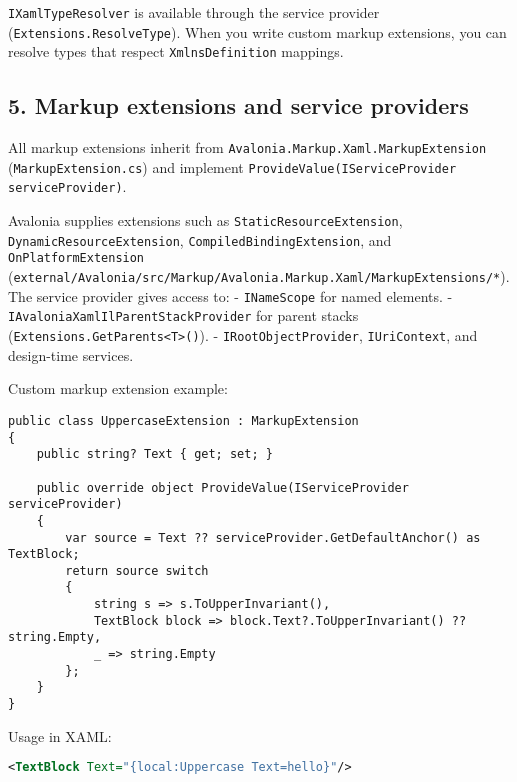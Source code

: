 \passthrough{\lstinline!IXamlTypeResolver!} is available through the
service provider (\passthrough{\lstinline!Extensions.ResolveType!}).
When you write custom markup extensions, you can resolve types that
respect \passthrough{\lstinline!XmlnsDefinition!} mappings.

\subsection{5. Markup extensions and service
providers}\label{markup-extensions-and-service-providers}

All markup extensions inherit from
\passthrough{\lstinline!Avalonia.Markup.Xaml.MarkupExtension!}
(\passthrough{\lstinline!MarkupExtension.cs!}) and implement
\passthrough{\lstinline!ProvideValue(IServiceProvider serviceProvider)!}.

Avalonia supplies extensions such as
\passthrough{\lstinline!StaticResourceExtension!},
\passthrough{\lstinline!DynamicResourceExtension!},
\passthrough{\lstinline!CompiledBindingExtension!}, and
\passthrough{\lstinline!OnPlatformExtension!}
(\passthrough{\lstinline!external/Avalonia/src/Markup/Avalonia.Markup.Xaml/MarkupExtensions/*!}).
The service provider gives access to: -
\passthrough{\lstinline!INameScope!} for named elements. -
\passthrough{\lstinline!IAvaloniaXamlIlParentStackProvider!} for parent
stacks (\passthrough{\lstinline!Extensions.GetParents<T>()!}). -
\passthrough{\lstinline!IRootObjectProvider!},
\passthrough{\lstinline!IUriContext!}, and design-time services.

Custom markup extension example:

\begin{lstlisting}
public class UppercaseExtension : MarkupExtension
{
    public string? Text { get; set; }

    public override object ProvideValue(IServiceProvider serviceProvider)
    {
        var source = Text ?? serviceProvider.GetDefaultAnchor() as TextBlock;
        return source switch
        {
            string s => s.ToUpperInvariant(),
            TextBlock block => block.Text?.ToUpperInvariant() ?? string.Empty,
            _ => string.Empty
        };
    }
}
\end{lstlisting}

Usage in XAML:

\begin{lstlisting}[language=XML]
<TextBlock Text="{local:Uppercase Text=hello}"/>
\end{lstlisting}

